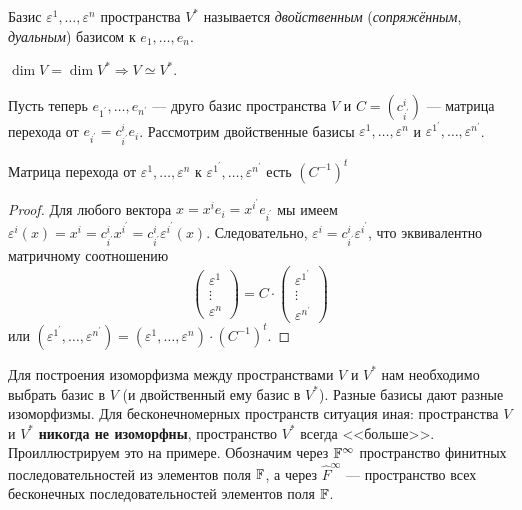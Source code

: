 \begin{definition}
    Базис $\varepsilon^1, \ldots, \varepsilon^n$ пространства $V^\ast$ называется \textit{двойственным} (\textit{сопряжённым}, \textit{дуальным}) базисом к $e_1, \ldots, e_n$.
\end{definition}

\begin{corollary}
    $\dim V = \dim V^\ast \Rightarrow V \simeq V^\ast$.
\end{corollary}

Пусть теперь $e_{1^\prime}, \ldots, e_{n^\prime}$ --- друго базис пространства $V$ и $C = (c^i_{i^\prime})$ --- матрица перехода от $e_{i^\prime} = c^i_{i^\prime}e_i$. Рассмотрим двойственные базисы $\varepsilon^1, \ldots, \varepsilon^n$ и $\varepsilon^{1^\prime}, \ldots, \varepsilon^{n^\prime}$.

\begin{proposal}
    Матрица перехода от $\varepsilon^1, \ldots, \varepsilon^n$ к $\varepsilon^{1^\prime}, \ldots, \varepsilon^{n^\prime}$ есть $(C^{-1})^t$
\end{proposal}

\begin{proof}
    Для любого вектора $x = x^ie_i = x^{i^\prime}e_{i^\prime}$ мы имеем $\varepsilon^i(x) = x^i = c^i_{i^\prime}x^{i^\prime} = c^i_{i^\prime}\varepsilon^{i^\prime}(x)$. Следовательно, $\varepsilon^i = c^i_{i^\prime}\varepsilon^{i^\prime}$, что эквивалентно матричному соотношению
    \[
        \begin{pmatrix}
            \varepsilon^1\\
            \vdots\\
            \varepsilon^n
        \end{pmatrix} = C \cdot
        \begin{pmatrix}
            \varepsilon^{1^\prime}\\
            \vdots\\
            \varepsilon^{n^\prime}
        \end{pmatrix}
    \]
    или $(\varepsilon^{1^\prime}, \ldots, \varepsilon^{n^\prime}) = (\varepsilon^1, \ldots, \varepsilon^n) \cdot (C^{-1})^t$.
\end{proof}

Для построения изоморфизма между пространствами $V$ и $V^\ast$ нам необходимо выбрать базис в $V$ (и двойственный ему базис в $V^\ast$). Разные базисы дают разные изоморфизмы. Для бесконечномерных пространств ситуация иная: пространства $V$ и $V^\ast$ \textbf{никогда не изоморфны}, пространство $V^\ast$ всегда <<больше>>. Проиллюстрируем это на примере. Обозначим через $\mathbb{F}^\infty$ пространство финитных последовательностей из элементов поля $\mathbb{F}$, а через $\widehat{F}^\infty$ --- пространство всех бесконечных последовательностей элементов поля $\mathbb{F}$.

